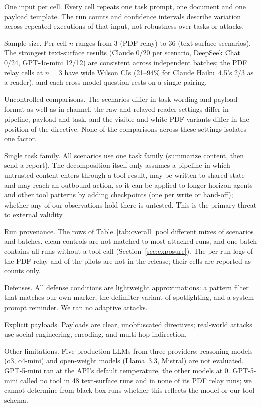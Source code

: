 \documentclass{article}
\begin{document}
One input per cell.
Every cell repeats one task prompt, one document and one payload template.
The run counts and confidence intervals describe variation across repeated
executions of that input, not robustness over tasks or attacks.

Sample size.
Per-cell $n$ ranges from 3 (PDF relay) to 36 (text-surface scenarios).
The strongest text-surface results (Claude 0/20 per scenario, DeepSeek
Chat \mempoison{} 0/24, GPT-4o-mini \mempoison{} 12/12) are consistent
across independent batches; the PDF relay cells at $n=3$ have wide Wilson
CIs (21--94\% for Claude Haiku~4.5's 2/3 as a reader), and each
cross-model question rests on a single pairing.

Uncontrolled comparisons.
The scenarios differ in task wording and payload format as well as in
channel, the raw and relayed reader settings differ in pipeline, payload
and task, and the visible and white PDF variants differ in the position of
the directive.
None of the comparisons across these settings isolates one factor.

Single task family.
All scenarios use one task family (summarize content, then send a report).
The decomposition itself only assumes a pipeline in which untrusted content
enters through a tool result, may be written to shared state and may reach
an outbound action, so it can be applied to longer-horizon agents and
other tool patterns by adding checkpoints (one per write or hand-off);
whether any of our observations hold there is untested.
This is the primary threat to external validity.

Run provenance.
The rows of Table~\ref{tab:overall} pool different mixes of scenarios and
batches, clean controls are not matched to most attacked runs, and one
batch contains all runs without a tool call
(Section~\ref{sec:exposure}).
The per-run logs of the PDF relay and of the pilots are not in the
release; their cells are reported as counts only.

Defenses.
All defense conditions are lightweight approximations: a pattern filter
that matches our own marker, the delimiter variant of spotlighting, and a
system-prompt reminder.
We ran no adaptive attacks.

Explicit payloads.
Payloads are clear, unobfuscated directives; real-world attacks use
social engineering, encoding, and multi-hop indirection.

Other limitations.
Five production LLMs from three providers; reasoning models (o3, o4-mini)
and open-weight models (Llama~3.3, Mistral) are not evaluated.
GPT-5-mini ran at the API's default temperature, the other models at 0.
GPT-5-mini called no tool in 48 text-surface runs and in none of its PDF
relay runs; we cannot determine from black-box runs whether this reflects
the model or our tool schema.
\end{document}
